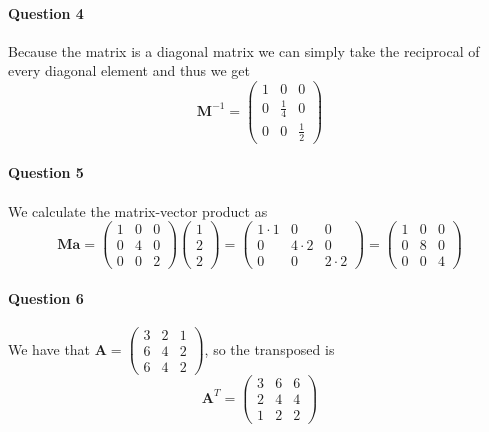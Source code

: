 \documentclass[a4paper, 11pt]{article}
\newcommand{\vect}[1]{\mathbf{#1}}
\newcommand{\mat}[1]{\textbf{#1}}
\begin{document}
\paragraph{Question 4}
Because the matrix is a diagonal matrix we can simply take the reciprocal of every diagonal element and thus we get
\[
    \mat M^{-1} = 
    \begin{pmatrix}
        1 & 0 & 0 \\
        0 & \frac{1}{4} & 0 \\
        0 & 0 & \frac{1}{2}
    \end{pmatrix}
\]

\paragraph{Question 5}
We calculate the matrix-vector product as
\[
    \mat M \vect a =
    \begin{pmatrix}
        1 & 0 & 0 \\
        0 & 4 & 0 \\
        0 & 0 & 2
    \end{pmatrix}
    \begin{pmatrix}
        1 \\ 2 \\ 2
    \end{pmatrix} =
    \begin{pmatrix}
        1 \cdot 1 & 0 & 0 \\
        0 & 4 \cdot 2 & 0 \\
        0 & 0 & 2 \cdot 2
    \end{pmatrix} = 
    \begin{pmatrix}
        1 & 0 & 0 \\
        0 & 8 & 0 \\
        0 & 0 & 4
    \end{pmatrix}
\]

\paragraph{Question 6}
We have that $\mat A = 
                \begin{pmatrix} 
                    3 & 2 & 1\\
                    6 & 4 & 2\\
                    6 & 4 & 2
                \end{pmatrix}$, so the transposed is
\[
    \mat A^T = \begin{pmatrix} 
                    3 & 6 & 6\\
                    2 & 4 & 4\\
                    1 & 2 & 2
                \end{pmatrix}
\]
\end{document}
